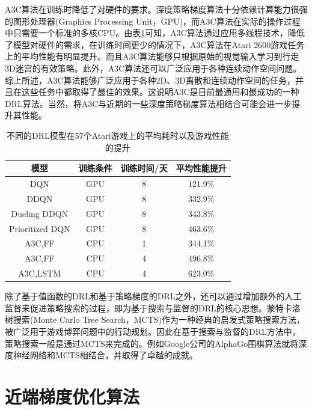 \documentclass[bachelor]{thesis-uestc}
\begin{document}
	A3C算法在训练时降低了对硬件的要求。深度策略梯度算法十分依赖计算能力很强的图形处理器(Graphics Processing Unit，GPU)，而A3C算法在实际的操作过程中只需要一个标准的多核CPU。由表\ref{tb1}可知，A3C算法通过应用多线程技术，降低了模型对硬件的需求，在训练时间更少的情况下，A3C算法在Atari 2600游戏任务上的平均性能有明显提升。而且A3C算法能够只根据原始的视觉输入学习到行走3D迷宫的有效策略。此外，A3C算法还可以广泛应用于各种连续动作空间问题。综上所述，A3C算法能够广泛应用于各种2D、3D离散和连续动作空间的任务，并且在这些任务中都取得了最佳的效果。这说明A3C是目前最通用和最成功的一种DRL算法。当然，将A3C与近期的一些深度策略梯度算法相结合可能会进一步提升其性能。
	
	\begin{table}[h]
		\caption{不同的DRL模型在57个Atari游戏上的平均耗时以及游戏性能的提升}
		\label{tb1}
		\begin{tabular}{cccc}
			\toprule[1.5pt]
			模型 & 训练条件 & 训练时间/天 & 平均性能提升 \\
			\hline
			DQN & GPU & 8 & 121.9\% \\
			DDQN & GPU & 8 & 332.9\% \\
			Dueling DDQN & GPU & 8 & 343.8\% \\
			Prioritized DQN & GPU & 8 & 463.6\% \\
			A3C,FF & CPU & 1 & 344.1\% \\
			A3C,FF & CPU & 4 & 496.8\% \\
			A3C,LSTM & CPU & 4 & 623.0\% \\
			\bottomrule[1.5pt]
		\end{tabular}
	\end{table}
	除了基于值函数的DRL和基于策略梯度的DRL之外，还可以通过增加额外的人工监督来促进策略搜索的过程，即为基于搜索与监督的DRL的核心思想。蒙特卡洛树搜索(Monte Carlo Tree Search，MCTS)作为一种经典的启发式策略搜索方法，被广泛用于游戏博弈问题中的行动规划。因此在基于搜索与监督的DRL方法中，策略搜索一般是通过MCTS来完成的。例如Google公司的AlphaGo围棋算法就将深度神经网络和MCTS相结合，并取得了卓越的成就。
	
	\section{近端梯度优化算法}\label{ppo}
\end{document}
